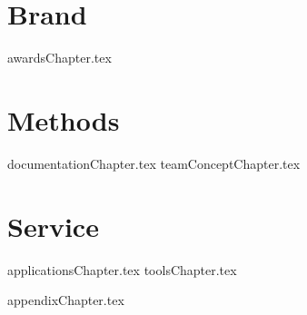 \documentclass[openany]{book}  %
\title{}  %
\begin{document}


\frontmatter %

\maketitle %

\tableofcontents %
	
\mainmatter %


\part{Brand} %
{awardsChapter.tex}	
	
\part{Methods}
{documentationChapter.tex}	
{teamConceptChapter.tex}
			
\part{Service}
{applicationsChapter.tex}
{toolsChapter.tex}

\backmatter
{}




{appendixChapter.tex}

\glsaddall
\printglossaries
\end{document}
